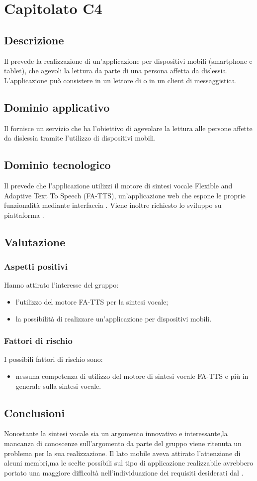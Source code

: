 \section {Capitolato C4}
	\subsection {Descrizione}
	Il  prevede la realizzazione di un'applicazione per dispositivi mobili (smartphone e tablet), che agevoli la
lettura da parte di una persona affetta da dislessia.  L'applicazione può consistere in un lettore di  o in un
client di messaggistica.
	\subsection {Dominio applicativo}
	Il  fornisce un servizio che ha l'obiettivo di agevolare la lettura alle persone affette da dislessia tramite l'utilizzo di dispositivi mobili. 
	\subsection {Dominio tecnologico}
Il  prevede che l'applicazione utilizzi il motore di sintesi vocale Flexible and Adaptive Text To Speech (FA-TTS), un'applicazione web che
espone le proprie funzionalità mediante interfaccia . Viene inoltre richiesto lo sviluppo su piattaforma .
	\subsection {Valutazione}
			\subsubsection {Aspetti positivi}
			Hanno attirato l'interesse del gruppo:
				\begin {itemize}
				  \item l'utilizzo del motore FA-TTS per la sintesi vocale;
				  \item la possibilità di realizzare un'applicazione per dispositivi mobili.		
				\end {itemize}
			\subsubsection {Fattori di rischio}
			I possibili fattori di rischio sono:
				\begin {itemize}
					\item nessuna competenza di utilizzo del motore di sintesi vocale FA-TTS e più in generale sulla sintesi vocale.
				\end {itemize}
	\subsection {Conclusioni}
		Nonostante la sintesi vocale sia un argomento innovativo e interessante,la mancanza di conoscenze sull'argomento da parte del gruppo viene ritenuta un problema per la sua realizzazione. Il lato mobile aveva attirato l'attenzione di alcuni membri,ma le scelte possibili sul tipo di applicazione realizzabile avrebbero portato una maggiore difficoltà nell'individuazione dei requisiti desiderati dal .